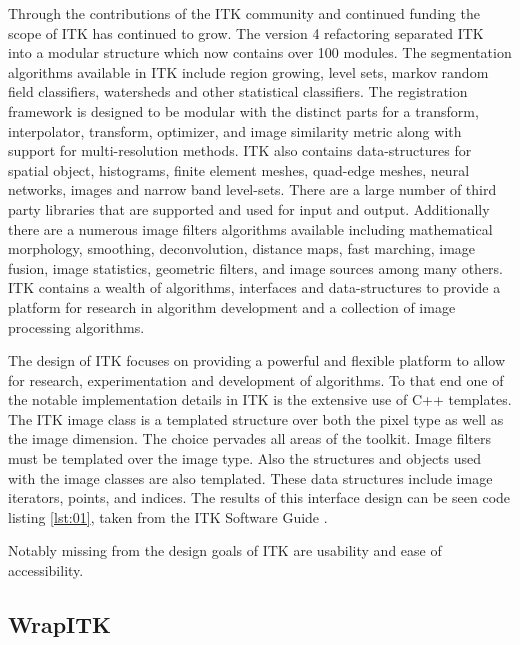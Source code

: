 \documentclass{frontiersMED} %
\begin{document}
Through the contributions of the ITK community and continued funding
the scope of ITK has continued to grow. The version 4 refactoring
separated ITK into a modular structure which now contains over 100
modules. The segmentation algorithms available in ITK include region
growing, level sets, markov random field classifiers, watersheds and
other statistical classifiers. The registration framework is designed
to be modular with the distinct parts for a transform, interpolator,
transform, optimizer, and image similarity metric along with support
for multi-resolution methods. ITK also contains data-structures for
spatial object, histograms, finite element meshes, quad-edge meshes,
neural networks, images and narrow band level-sets. There are a large
number of third party libraries that are supported and used for input
and output. Additionally there are a numerous image filters algorithms
available including mathematical morphology, smoothing, deconvolution,
distance maps, fast marching, image fusion, image statistics,
geometric filters, and image sources among many others. ITK contains a
wealth of algorithms, interfaces and data-structures to provide a
platform for research in algorithm development and a collection of
image processing algorithms.

The design of ITK focuses on providing a powerful and flexible
platform to allow for research, experimentation and development of
algorithms. To that end one of the notable implementation details in
ITK is the extensive use of C++ templates. The ITK image class is a
templated structure over both the pixel type as well as the image
dimension. The choice pervades all areas of the toolkit. Image filters
must be templated over the image type. Also the structures and objects
used with the image classes are also templated. These data structures
include image iterators, points, and indices. The results of this
interface design can be seen code listing \ref{lst:01}, taken from the
ITK Software Guide \cite{Ibanez2005}.



Notably missing from the design goals of ITK are usability and ease of
accessibility.


\subsection{WrapITK}
\end{document}
